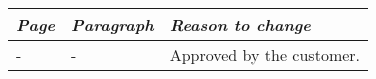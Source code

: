 \begin{longtable}{@{}llX@{}}
    \toprule
    \emph{Page} & \emph{Paragraph} & \emph{Reason to change}\\
    \midrule[1pt]
    \endhead
    - & - & Approved by the customer. \\
    \bottomrule
\end{longtable}
